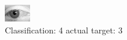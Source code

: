 \begin{figure}[h!]
\begin{center}
\includegraphics[width=0.60\columnwidth]{figures/ID2836_class_4_target_3.png}
\end{center}
\caption{ Classification: 4 actual target: 3}
\label{fig:ID2836_class_4_target_3}
\end{figure}
